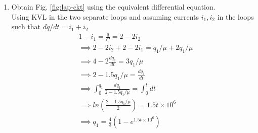 \documentclass[journal,12pt,twocolumn]{IEEEtran}
\renewcommand\thesection{\arabic{section}}
\begin{document}
\begin{enumerate}[label=\arabic*.,ref=\thesection.\theenumi]
		
	\item Obtain Fig. 
			\ref{fig:lap-ckt}
			using the equivalent differential equation.\\
			\solution Using KVL in the two separate loops and assuming currents $i_1, i_2$ in the loops such that $dq/dt =i_1+i_2$ \begin{align}
			  &1-i_1 = \frac{q}{C} = 2-2i_2  \\
			  &\implies 2-2i_2+2-2i_1 = q_1/\mu+2q_1/\mu\\
			  &\implies 4-2\frac{dq_1}{dt}=3q_1/\mu\\
			  &\implies 2-1.5q_1/\mu= \frac{dq_1}{dt} \\
            &\implies \int_0^{q_1} \frac{dq_1}{2-1.5 q_1/\mu}= \int_0^t dt\\
            &\implies ln(\frac{2-1.5q_1/\mu}{2})=1.5t\times10^6\\
            &\implies q_1 = \frac{4}{3}(1-e^{1.5t\times10^6})
			\end{align}
\end{enumerate}
\end{document}
